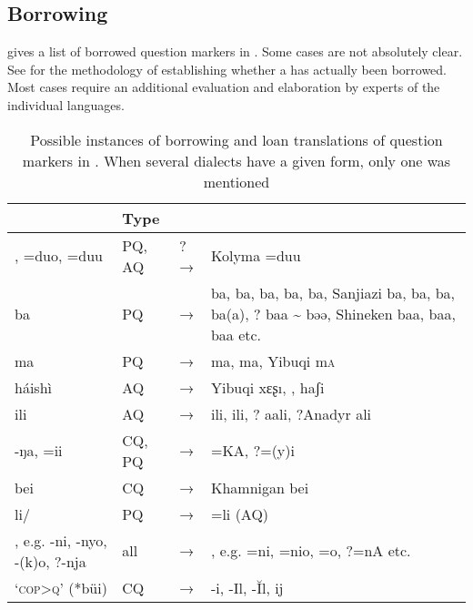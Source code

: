 \subsection{Borrowing}

 gives a list of borrowed question markers in . Some cases are not absolutely clear. See  for the methodology of establishing whether a  has actually been borrowed. Most cases require an additional evaluation and elaboration by experts of the individual languages.

\begin{table}
\caption{Possible instances of borrowing and loan translations of question markers in . When several dialects have a given form, only one was mentioned}
\label{tab:6:6}
\small 
\begin{tabularx}{\textwidth}{QllQ}
\lsptoprule
& \textbf{Type} &  & \\
\midrule
{},  =duo, =duu & PQ, AQ & ?→ & Kolyma  =duu\\
 ba  & PQ & → &  ba,  ba,  ba,  ba,  ba, Sanjiazi  ba,  ba,  ba,  ba(a), ? baa {\textasciitilde} bəə, Shineken  baa,  baa,  baa etc.\\
 ma  & PQ & → &  ma,  ma, Yibuqi  m\textsc{a}\\
 háishì  & AQ & → & Yibuqi  xɛʂı, ,  haʃi\\
 ili & AQ & → &  ili,  ili, ? aali, ?Anadyr  ali\\
 -ŋa, =ii & CQ, PQ & → &  =KA, ?=(y)i\\
 bei & CQ & → & Khamnigan  bei\\
 li/ & PQ & → &  =li (AQ)\\
, e.g.  -ni, -nyo, -(k)o, ?-nja & all & → & , e.g.  =ni, =nio, =o, ?=nA etc.\\
 ‘\textsc{cop>q}’ (*büi) & CQ & → &  -i,  -Il,  -Ĭl,  ij\\

\end{tabularx}
\end{table}
